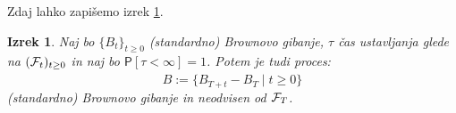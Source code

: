 \documentclass[11pt]{article}
\newtheorem{izrek}{Izrek}
\begin{document}
    Zdaj lahko zapišemo izrek \ref{thm:stopped_brownian}. %
    
    \begin{izrek}
        Naj bo $\{B_t\}_{t \geq 0}$ (standardno) Brownovo gibanje, $\tau$ čas ustavljanja glede na 
        $(\mathcal{F}_t)_{t \geq 0}$ in naj bo $\mathsf{P}[\tau < \infty]=1$.
        Potem je tudi proces:
        \[
        \hat{B} := \{B_{T+t} - B_T \mid t \geq 0\}
        \]
        (standardno) Brownovo gibanje in neodvisen od $\mathcal{F}_T$.
        \label{thm:stopped_brownian}
    \end{izrek}

    
    
\end{document}
